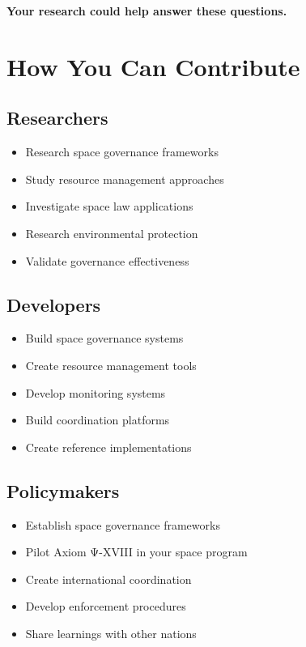 \textbf{Your research could help answer these questions.}

\vspace{0.5cm}

\section{How You Can Contribute}

\subsection{Researchers}

\begin{itemize}
    \item Research space governance frameworks
    \item Study resource management approaches
    \item Investigate space law applications
    \item Research environmental protection
    \item Validate governance effectiveness
\end{itemize}

\subsection{Developers}

\begin{itemize}
    \item Build space governance systems
    \item Create resource management tools
    \item Develop monitoring systems
    \item Build coordination platforms
    \item Create reference implementations
\end{itemize}

\subsection{Policymakers}

\begin{itemize}
    \item Establish space governance frameworks
    \item Pilot Axiom Ψ-XVIII in your space program
    \item Create international coordination
    \item Develop enforcement procedures
    \item Share learnings with other nations
\end{itemize}


